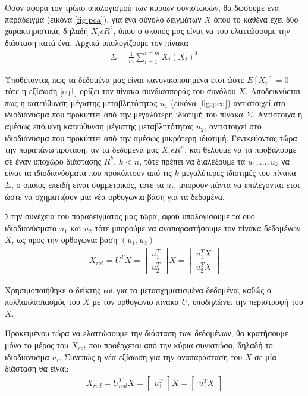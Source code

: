 \documentclass[11pt,a4paper,english,greek,twoside]{../Thesis}
\begin{document}
\par Όσον αφορά τον τρόπο υπολογισμού των κύριων συνιστωσών, θα δώσουμε ένα παράδειγμα (εικόνα \ref{fig:pca}), για ένα σύνολο δειγμάτων $X$ όπου το καθένα έχει δύο χαρακτηριστικά, δηλαδή $X_i \epsilon R^2$, όπου ο σκοπός μας είναι να του ελαττώσουμε την διάσταση κατά ένα. Αρχικά υπολογίζουμε τον πίνακα 
\begin{align}
\Sigma = \frac{1}{m}\sum_{i=1}^{i=m} X_i(X_i)^T \label{eq1}
\end{align}

\par Υποθέτοντας πως τα δεδομένα μας είναι κανονικοποιημένα έτσι ώστε $E[X_i]=0$ τότε η εξίσωση \eqref{eq1} ορίζει τον πίνακα συνδιασποράς του συνόλου $X$. Αποδεικνύεται πως η κατεύθυνση μέγιστης μεταβλητότητας $u_1$ (εικόνα \ref{fig:pca}) αντιστοιχεί στο ιδιοδιάνυσμα που προκύπτει από την μεγαλύτερη ιδιοτιμή του πίνακα $\Sigma$. Αντίστοιχα η αμέσως επόμενη κατεύθυνση μέγιστης μεταβλητότητας $u_2$, αντιστοιχεί στο ιδιοδιάνυσμα που προκύπτει από την αμέσως μικρότερη ιδιοτιμή. Γενικεύοντας τώρα την παραπάνω πρόταση, αν τα δεδομένα μας $X_i \epsilon R^n$, και θέλουμε να τα προβάλουμε σε έναν υποχώρο διάστασης $R^k$, $k<n$, τότε πρέπει να διαλέξουμε τα $u_1,...,u_k$ να είναι τα ιδιοδιανύσματα που προκύπτουν από τις $k$ μεγαλύτερες ιδιοτιμές του πίνακα $\Sigma$, ο οποίος επειδή είναι συμμετρικός, τότε τα $u_i$, μπορούν πάντα να επιλέγονται έτσι ώστε να σχηματίζουν μια νέα ορθογώνια βάση για τα δεδομένα.

\par Στην συνέχεια του παραδείγματος μας τώρα, αφού υπολογίσουμε τα δύο ιδιοδιανύσματα $u_1$ και $u_2$ τότε μπορούμε να αναπαραστήσουμε τον πίνακα δεδομένων $X$, ως προς την ορθογώνια βάση $(u_1,u_2)$
\begin{align}
X_{rot} = U^TX =\begin{bmatrix}u_1^T\\u_2^T\end{bmatrix}X= \begin{bmatrix}u_1^TX\\u_2^TX\end{bmatrix}
\label{eq2}
\end{align}
\par Χρησιμοποιήθηκε ο δείκτης rot για τα μετασχηματισμένα δεδομένα, καθώς ο πολλαπλασιασμός του $X$ με τον ορθογώνιο πίνακα $U$, υποδηλώνει την περιστροφή του $X$.
\par Προκειμένου τώρα να ελαττώσουμε την διάσταση των δεδομένων, θα κρατήσουμε μόνο το μέρος του $X_{rot}$ που προέρχεται από την κύρια συνιστώσα, δηλαδή το ιδιοδιάνυσμα $u_i$. Συνεπώς η νέα εξίσωση για την αναπαράσταση του $X$ σε μία διάσταση θα είναι:
\begin{align}
X_{red} = U_{red}^TX =\begin{bmatrix}u_1^T\end{bmatrix}X= \begin{bmatrix}u_1^TX\end{bmatrix}
\label{eq3}
\end{align}
\end{document}
